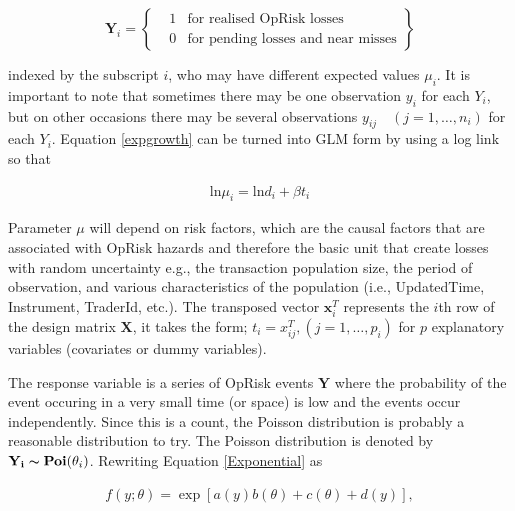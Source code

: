 \documentclass{DissertateUSU}
\begin{document}
\begin{definition}\label{DefLosInd}
\singlespacing
\begin{equation}\label{LossIndicator}
\mathbf {Y}_i =\left\{\begin{array}{rcl}
                 & 1 & \mbox{for realised OpRisk losses}  \\
                 & 0 & \mbox{for pending losses and near misses} 
                      \end{array}\right\}
\end{equation}
\doublespacing
\end{definition}

indexed by the subscript \(i\), who may have different expected values
\(\mu_i\). It is important to note that sometimes there may be one
observation \(y_i\) for each \(Y_i\), but on other occasions there may
be several observations \(y_{ij}\quad(j=1,\ldots,n_i)\) for each
\(Y_i\). Equation \ref{expgrowth} can be turned into GLM form by using a
log link so that

\singlespacing

\begin{eqnarray}\label{linearcombination}
\mbox{ln}\mu_i = \mbox{ln}d_i + \beta t_i
\end{eqnarray} \doublespacing

Parameter \(\mu\) will depend on risk factors, which are the causal
factors that are associated with OpRisk hazards and therefore the basic
unit that create losses with random uncertainty e.g., the transaction
population size, the period of observation, and various characteristics
of the population (i.e., UpdatedTime, Instrument, TraderId, etc.). The
transposed vector \(\mathbf{x}_i^T\) represents the \(i\)th row of the
design matrix \(\mathbf{X}\), it takes the form;
\(t_i = x_{ij}^T, (j=1,\ldots,p_i)\) for \(p\) explanatory variables
(covariates or dummy variables).\medskip

The response variable is a series of OpRisk events \(\mathbf{Y}\) where
the probability of the event occuring in a very small time (or space) is
low and the events occur independently. Since this is a count, the
Poisson distribution is probably a reasonable distribution to try. The
Poisson distribution is denoted by
\(\mathbf{Y_i} \thicksim \mathbf{Poi}(\theta_i)\). Rewriting Equation
\ref{Exponential} as

\singlespacing

\begin{eqnarray}\label{CanonicalExponential}
f(y;\theta) = \exp[a(y)b(\theta) + c(\theta) + d(y)],
\end{eqnarray} \doublespacing
\end{document}
